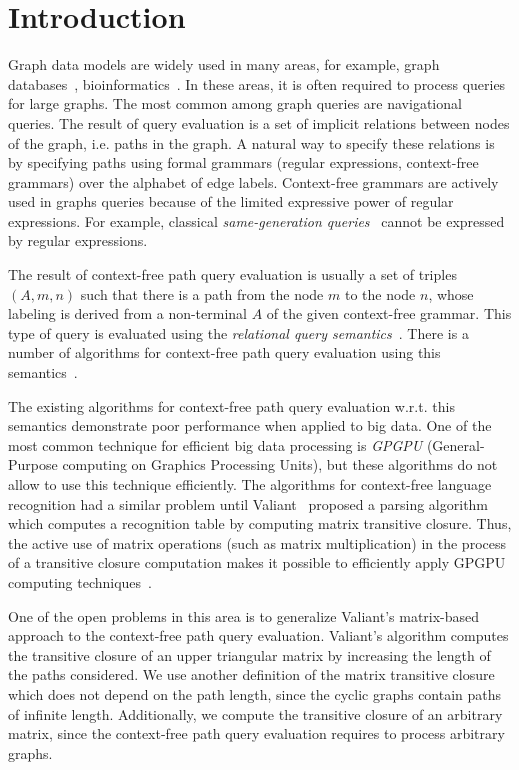 \section{Introduction}
Graph data models are widely used in many areas, for example, graph databases~\cite{graphDB}, bioinformatics~\cite{Bio}. In these areas, it is often required to process queries for large graphs. The most common among graph queries are navigational queries. The result of query evaluation is a set of implicit relations between nodes of the graph, i.e. paths in the graph. A natural way to specify these relations is by specifying paths using formal grammars (regular expressions, context-free grammars) over the alphabet of edge labels. Context-free grammars are actively used in graphs queries because of the limited expressive power of regular expressions. For example, classical \textit{same-generation queries}~\cite{FndDB} cannot be expressed by regular expressions.

The result of context-free path query evaluation is usually a set of triples $(A, m, n)$ such that there is a path from the node $m$ to the node $n$, whose labeling is derived from a non-terminal $A$ of the given context-free grammar. This type of query is evaluated using the \textit{relational query semantics}~\cite{hellingsRelational}. There is a number of algorithms for context-free path query evaluation using this semantics~\cite{GLL, hellingsRelational, RDF, GraphQueryWithEarley}.

The existing algorithms for context-free path query evaluation w.r.t. this semantics demonstrate poor performance when applied to big data. One of the most common technique for efficient big data processing is \textit{GPGPU} (General-Purpose computing on Graphics Processing Units), but these algorithms do not allow to use this technique efficiently. The algorithms for context-free language recognition had a similar problem until Valiant~\cite{valiant} proposed a parsing algorithm which computes a recognition table by computing matrix transitive closure. Thus, the active use of matrix operations (such as matrix multiplication) in the process of a transitive closure computation makes it possible to efficiently apply GPGPU computing techniques~\cite{matricesOnGPGPU}.

One of the open problems in this area is to generalize Valiant's matrix-based approach to the context-free path query evaluation. Valiant's algorithm computes the transitive closure of an upper triangular matrix by increasing the length of the paths considered. We use another definition of the matrix transitive closure which does not depend on the path length, since the cyclic graphs contain paths of infinite length. Additionally, we compute the transitive closure of an arbitrary matrix, since the context-free path query evaluation requires to process arbitrary graphs. 


